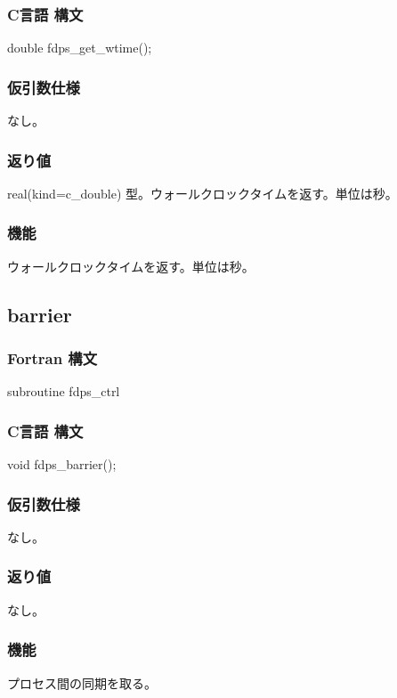 \subsubsection*{C言語 構文}
\begin{screen}
\begin{spverbatim}
double fdps_get_wtime();
\end{spverbatim}
\end{screen}

\subsubsection*{仮引数仕様}
なし。

\subsubsection*{返り値}
real(kind=c\_double) 型。ウォールクロックタイムを返す。単位は秒。

\subsubsection*{機能}
ウォールクロックタイムを返す。単位は秒。
\clearpage

\subsection{barrier}
\subsubsection*{Fortran 構文}
\begin{screen}
\begin{spverbatim}
subroutine fdps_ctrl%
\end{spverbatim}
\end{screen}

\subsubsection*{C言語 構文}
\begin{screen}
\begin{spverbatim}
void fdps_barrier();
\end{spverbatim}
\end{screen}

\subsubsection*{仮引数仕様}
なし。

\subsubsection*{返り値}
なし。

\subsubsection*{機能}
プロセス間の同期を取る。